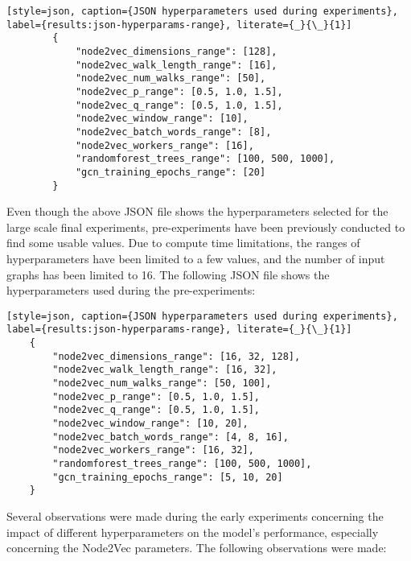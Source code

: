 \begin{lstlisting}[style=json, caption={JSON hyperparameters used during experiments}, label={results:json-hyperparams-range}, literate={_}{\_}{1}]
        {
            "node2vec_dimensions_range": [128],
            "node2vec_walk_length_range": [16],
            "node2vec_num_walks_range": [50],
            "node2vec_p_range": [0.5, 1.0, 1.5],
            "node2vec_q_range": [0.5, 1.0, 1.5],
            "node2vec_window_range": [10],
            "node2vec_batch_words_range": [8],
            "node2vec_workers_range": [16],
            "randomforest_trees_range": [100, 500, 1000],
            "gcn_training_epochs_range": [20]
        }
\end{lstlisting}

Even though the above JSON file shows the hyperparameters selected for the large scale final experiments, pre-experiments have been previously conducted to find some usable values. Due to compute time limitations, the ranges of hyperparameters have been limited to a few values, and the number of input graphs has been limited to 16. The following JSON file shows the hyperparameters used during the pre-experiments:

\begin{lstlisting}[style=json, caption={JSON hyperparameters used during experiments}, label={results:json-hyperparams-range}, literate={_}{\_}{1}]
    {
        "node2vec_dimensions_range": [16, 32, 128],
        "node2vec_walk_length_range": [16, 32],
        "node2vec_num_walks_range": [50, 100],
        "node2vec_p_range": [0.5, 1.0, 1.5],
        "node2vec_q_range": [0.5, 1.0, 1.5],
        "node2vec_window_range": [10, 20],
        "node2vec_batch_words_range": [4, 8, 16],
        "node2vec_workers_range": [16, 32],
        "randomforest_trees_range": [100, 500, 1000],
        "gcn_training_epochs_range": [5, 10, 20]
    }
\end{lstlisting}

Several observations were made during the early experiments concerning the impact of different hyperparameters on the model's performance, especially concerning the Node2Vec parameters. The following observations were made:

